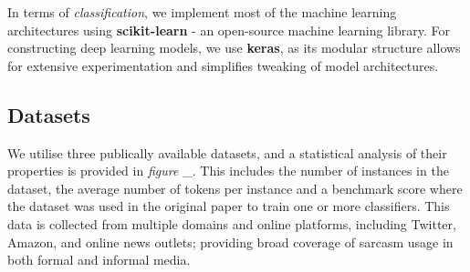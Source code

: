 \documentclass[12pt,a4paper]{article}
\begin{document}
In terms of \textit{classification}, we implement most of the machine learning architectures using \textbf{scikit-learn} - an open-source machine learning library. For constructing deep learning models, we use \textbf{keras}, as its modular structure allows for extensive experimentation and simplifies tweaking of model architectures.

\subsection{Datasets}
\vspace{-4.2pt}\noindent We utilise three publically available datasets, and a statistical analysis of their properties is provided in \textit{figure \_}. This includes the number of instances in the dataset, the average number of tokens per instance and a benchmark score where the dataset was used in the original paper to train one or more classifiers. This data is collected from multiple domains and online platforms, including Twitter, Amazon, and online news outlets; providing broad coverage of sarcasm usage in both formal and informal media.
\end{document}
